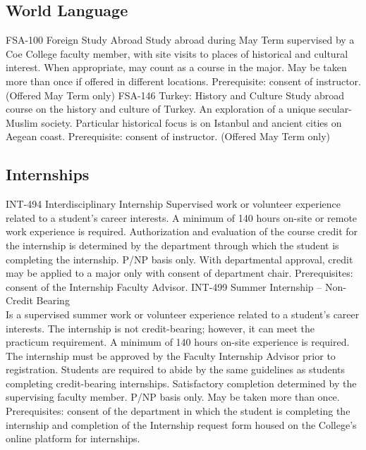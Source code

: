 \documentclass[
  letterpaper,
]{scrbook}
\begin{document}
\hypertarget{world-language}{%
\subsection{World Language}\label{world-language}}

FSA-100 Foreign Study Abroad Study abroad during May Term supervised by
a Coe College faculty member, with site visits to places of historical
and cultural interest. When appropriate, may count as a course in the
major. May be taken more than once if offered in different locations.
Prerequisite: consent of instructor. (Offered May Term only) FSA-146
Turkey: History and Culture Study abroad course on the history and
culture of Turkey. An exploration of a unique secular-Muslim society.
Particular historical focus is on Istanbul and ancient cities on Aegean
coast. Prerequisite: consent of instructor. (Offered May Term only)

\hypertarget{internships}{%
\subsection{Internships}\label{internships}}

INT-494 Interdisciplinary Internship Supervised work or volunteer
experience related to a student's career interests. A minimum of 140
hours on-site or remote work experience is required. Authorization and
evaluation of the course credit for the internship is determined by the
department through which the student is completing the internship. P/NP
basis only. With departmental approval, credit may be applied to a major
only with consent of department chair. Prerequisites: consent of the
Internship Faculty Advisor. INT-499 Summer Internship -- Non-Credit
Bearing\\
Is a supervised summer work or volunteer experience related to a
student's career interests. The internship is not credit-bearing;
however, it can meet the practicum requirement. A minimum of 140 hours
on-site experience is required. The internship must be approved by the
Faculty Internship Advisor prior to registration. Students are required
to abide by the same guidelines as students completing credit-bearing
internships. Satisfactory completion determined by the supervising
faculty member. P/NP basis only. May be taken more than once.
Prerequisites: consent of the department in which the student is
completing the internship and completion of the Internship request form
housed on the College's online platform for internships.
\end{document}
